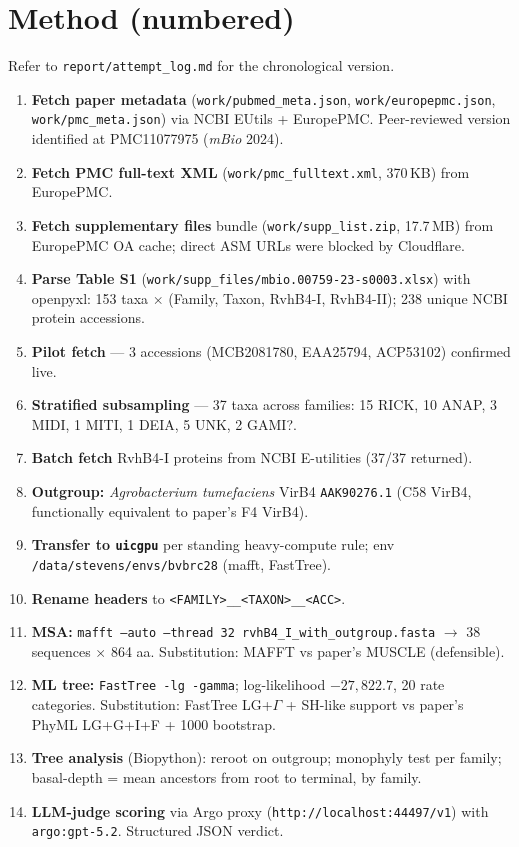 \documentclass[11pt,letterpaper]{article}
\begin{document}
\section{Method (numbered)}

Refer to \texttt{report/attempt\_log.md} for the chronological version.

\begin{enumerate}[leftmargin=1.6em]
  \item \textbf{Fetch paper metadata} (\texttt{work/pubmed\_meta.json}, \texttt{work/europepmc.json},
    \texttt{work/pmc\_meta.json}) via NCBI EUtils + EuropePMC. Peer-reviewed version identified
    at PMC11077975 (\emph{mBio} 2024).
  \item \textbf{Fetch PMC full-text XML} (\texttt{work/pmc\_fulltext.xml}, 370\,KB) from EuropePMC.
  \item \textbf{Fetch supplementary files} bundle (\texttt{work/supp\_list.zip}, 17.7\,MB) from
    EuropePMC OA cache; direct ASM URLs were blocked by Cloudflare.
  \item \textbf{Parse Table S1} (\texttt{work/supp\_files/mbio.00759-23-s0003.xlsx}) with openpyxl:
    153 taxa $\times$ (Family, Taxon, RvhB4-I, RvhB4-II); 238 unique NCBI protein accessions.
  \item \textbf{Pilot fetch} --- 3 accessions (MCB2081780, EAA25794, ACP53102) confirmed live.
  \item \textbf{Stratified subsampling} --- 37 taxa across families: 15 RICK, 10 ANAP, 3 MIDI,
    1 MITI, 1 DEIA, 5 UNK, 2 GAMI?.
  \item \textbf{Batch fetch} RvhB4-I proteins from NCBI E-utilities (37/37 returned).
  \item \textbf{Outgroup:} \emph{Agrobacterium tumefaciens} VirB4 \texttt{AAK90276.1}
    (C58 VirB4, functionally equivalent to paper's F4 VirB4).
  \item \textbf{Transfer to \texttt{uicgpu}} per standing heavy-compute rule; env
    \texttt{/data/stevens/envs/bvbrc28} (mafft, FastTree).
  \item \textbf{Rename headers} to \texttt{<FAMILY>\_\_<TAXON>\_\_<ACC>}.
  \item \textbf{MSA:} \texttt{mafft --auto --thread 32 rvhB4\_I\_with\_outgroup.fasta}
    $\rightarrow$ 38 sequences $\times$ 864 aa. Substitution: MAFFT vs paper's MUSCLE (defensible).
  \item \textbf{ML tree:} \texttt{FastTree -lg -gamma}; log-likelihood $-27{,}822.7$, 20 rate
    categories. Substitution: FastTree LG+$\Gamma$ + SH-like support vs paper's PhyML
    LG+G+I+F + 1000 bootstrap.
  \item \textbf{Tree analysis} (Biopython): reroot on outgroup; monophyly test per family;
    basal-depth = mean ancestors from root to terminal, by family.
  \item \textbf{LLM-judge scoring} via Argo proxy (\texttt{http://localhost:44497/v1}) with
    \texttt{argo:gpt-5.2}. Structured JSON verdict.
\end{enumerate}
\end{document}
